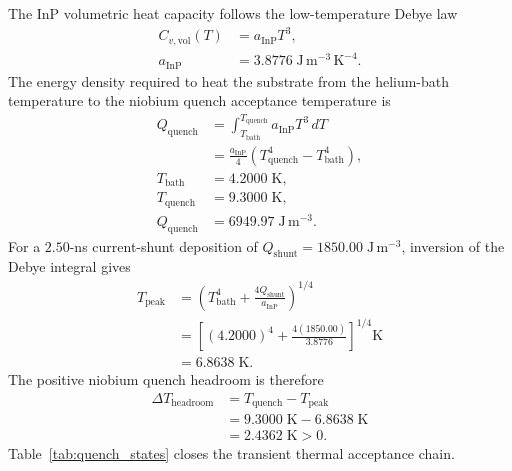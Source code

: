 \documentclass[10pt,twocolumn]{IEEEtran}
\begin{document}
The InP volumetric heat capacity follows the low-temperature Debye law
\begin{equation}
\begin{aligned}
C_{v,\mathrm{vol}}(T)&=a_{\mathrm{InP}}T^3, \\
a_{\mathrm{InP}}&=3.8776\;\mathrm{J\,m^{-3}\,K^{-4}}.
\end{aligned}
\label{eq:debye_heat_capacity}
\end{equation}
The energy density required to heat the substrate from the helium-bath temperature to the niobium quench acceptance temperature is
\begin{equation}
\begin{aligned}
Q_{\mathrm{quench}}
&=\int_{T_{\mathrm{bath}}}^{T_{\mathrm{quench}}}
a_{\mathrm{InP}}T^3\,dT \\
&=\frac{a_{\mathrm{InP}}}{4}
\left(T_{\mathrm{quench}}^4-T_{\mathrm{bath}}^4\right), \\
T_{\mathrm{bath}}&=4.2000\;\mathrm{K}, \\
T_{\mathrm{quench}}&=9.3000\;\mathrm{K}, \\
Q_{\mathrm{quench}}&=6949.97\;\mathrm{J\,m^{-3}}.
\end{aligned}
\label{eq:quench_energy_density}
\end{equation}
For a $2.50$-ns current-shunt deposition of $Q_{\mathrm{shunt}}=1850.00\;\mathrm{J\,m^{-3}}$, inversion of the Debye integral gives
\begin{equation}
\begin{aligned}
T_{\mathrm{peak}}
&=\left(T_{\mathrm{bath}}^4
+\frac{4Q_{\mathrm{shunt}}}{a_{\mathrm{InP}}}\right)^{1/4} \\
&=\left[(4.2000)^4+
\frac{4(1850.00)}{3.8776}\right]^{1/4}\mathrm{K} \\
&=6.8638\;\mathrm{K}.
\end{aligned}
\label{eq:post_shunt_temperature}
\end{equation}
The positive niobium quench headroom is therefore
\begin{equation}
\begin{aligned}
\Delta T_{\mathrm{headroom}}
&=T_{\mathrm{quench}}-T_{\mathrm{peak}} \\
&=9.3000\;\mathrm{K}-6.8638\;\mathrm{K} \\
&=2.4362\;\mathrm{K}>0.
\end{aligned}
\label{eq:quench_headroom}
\end{equation}
Table~\ref{tab:quench_states} closes the transient thermal acceptance chain.
\end{document}
